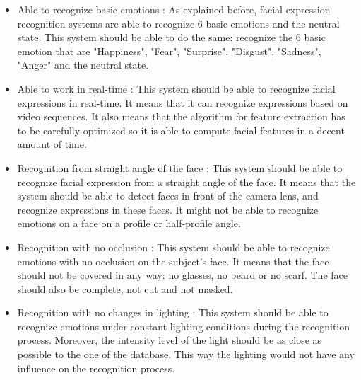 \begin{itemize}
  \item Able to recognize basic emotions : 
  \noindent As explained before, facial expression recognition systems are able to recognize 6 basic emotions and the neutral state. This system should be able to do the same: recognize the 6 basic emotion that are "Happiness", "Fear", "Surprise", "Disgust", "Sadness", "Anger" and the neutral state.
\newline

  \item Able to work in real-time : 
  \noindent This system should be able to recognize facial expressions in real-time. It means that it can recognize expressions based on video sequences. It also means that the algorithm for feature extraction has to be carefully optimized so it is able to compute facial features in a decent amount of time. 
\newline

  \item Recognition from straight angle of the face : 
  \noindent This system should be able to recognize facial expression from a straight angle of the face. It means that the system should be able to detect faces in front of the camera lens, and recognize expressions in these faces. It might not be able to recognize emotions on a face on a profile or half-profile angle.
\newline

  \item Recognition with no occlusion : 
  \noindent This system should be able to recognize emotions with no occlusion on the subject's face. It means that the face should not be covered in any way: no glasses, no beard or no scarf. The face should also be complete, not cut and not masked.
\newline

  \item Recognition with no changes in lighting : 
  \noindent This system should be able to recognize emotions under constant lighting conditions during the recognition process. Moreover, the intensity level of the light should be as close as possible to the one of the database. This way the lighting would not have any influence on the recognition process.
\newline
\end{itemize}











